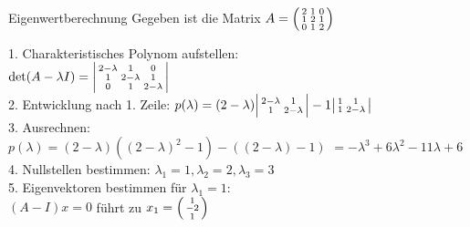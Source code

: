 \begin{example2}{Eigenwertberechnung}
Gegeben ist die Matrix
$A = \begin{psmallmatrix} 
2 & 1 & 0 \\
1 & 2 & 1 \\
0 & 1 & 2
\end{psmallmatrix}$

1. Charakteristisches Polynom aufstellen:\\
   $\det(A - \lambda I) = \begin{vsmallmatrix} 
   2-\lambda & 1 & 0 \\
   1 & 2-\lambda & 1 \\
   0 & 1 & 2-\lambda
   \end{vsmallmatrix}$
   \vspace{1mm}\\
2. Entwicklung nach 1. Zeile:
   $p(\lambda) = (2-\lambda)\begin{vsmallmatrix}
   2-\lambda & 1 \\
   1 & 2-\lambda
   \end{vsmallmatrix} - 1\begin{vsmallmatrix}
   1 & 1 \\
   1 & 2-\lambda
   \end{vsmallmatrix}$
   \vspace{1mm}\\
3. Ausrechnen:\\
   $p(\lambda) = (2-\lambda)((2-\lambda)^2 - 1) - ((2-\lambda) - 1)$
   $= -\lambda^3 + 6\lambda^2 - 11\lambda + 6$
   \vspace{1mm}\\
4. Nullstellen bestimmen:
   $\lambda_1 = 1, \lambda_2 = 2, \lambda_3 = 3$
\vspace{1mm}\\
5. Eigenvektoren bestimmen für $\lambda_1 = 1$:\\
   $(A - I)x = 0$ führt zu $x_1 = \begin{psmallmatrix} 1 \\ -2 \\ 1 \end{psmallmatrix}$
\end{example2}

